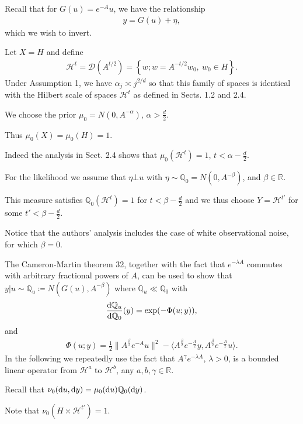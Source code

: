 \documentclass[oneside,11pt]{book}
\numberwithin{equation}{section}
\begin{document}
Recall that for $G(u) = e^{-A}u$, we have the relationship
\begin{align*}
    y = G(u) + \eta,
\end{align*}
which we wish to invert.

Let $X = H$ and define
\begin{align*}
    \mathcal{H}^t = \mathcal{D}(A^{t/2}) = \left\{w;w = A^{-t/2}w_0,\ w_0\in H\right\}.
\end{align*}
Under Assumption 1, we have $\alpha_j\asymp j^{2/d}$ so that this family of spaces is identical with the Hilbert scale of spaces $\mathcal{H}^t$ as defined in Sects. 1.2 and 2.4.

%
We choose the prior $\mu_0 = N(0,A^{-\alpha})$, $\alpha > \frac{d}{2}$.

Thus $\mu_0(X) = \mu_0(H) = 1$.

Indeed the analysis in Sect. 2.4 shows that $\mu_0(\mathcal{H}^t) = 1$, $t < \alpha - \frac{d}{2}$.

For the likelihood we assume that $\eta\bot u$ with $\eta\sim\mathbb{Q}_0 = N(0,A^{-\beta})$, and $\beta\in\mathbb{R}$.

This measure satisfies $\mathbb{Q}_0(\mathcal{H}^t) = 1$ for $t < \beta - \frac{d}{2}$ and we thus choose $Y = \mathcal{H}^{t'}$ for some $t' < \beta - \frac{d}{2}$.

Notice that the authors' analysis includes the case of white observational noise, for which $\beta = 0$.

The Cameron-Martin theorem 32, together with the fact that $e^{-\lambda A}$ commutes with arbitrary fractional powers of $A$, can be used to show that $y|u\sim\mathbb{Q}_u\coloneqq N(G(u),A^{-\beta})$ where $\mathbb{Q}_u\ll\mathbb{Q}_0$ with
\begin{align*}
    \frac{{\rm d}\mathbb{Q}_u}{{\rm d}\mathbb{Q}_0}(y) = \exp(-\Phi(u;y)),
\end{align*}
and
\begin{align*}
    \Phi(u;y) = \frac{1}{2}\|A^{\frac{\beta}{2}}e^{-A}u\|^2 - \langle A^{\frac{\beta}{2}}e^{-\frac{A}{2}}y,A^{\frac{\beta}{2}}e^{-\frac{A}{2}}u\rangle.
\end{align*}
In the following we repeatedly use the fact that $A^\gamma e^{-\lambda A}$, $\lambda > 0$, is a bounded linear operator from $\mathcal{H}^a$ to $\mathcal{H}^b$, any $a,b,\gamma\in\mathbb{R}$.

Recall that $\nu_0({\rm d}u,{\rm d}y) = \mu_0({\rm d}u)\mathbb{Q}_0({\rm d}y)$.

Note that $\nu_0(H\times\mathcal{H}^{t'}) = 1$.
\end{document}
